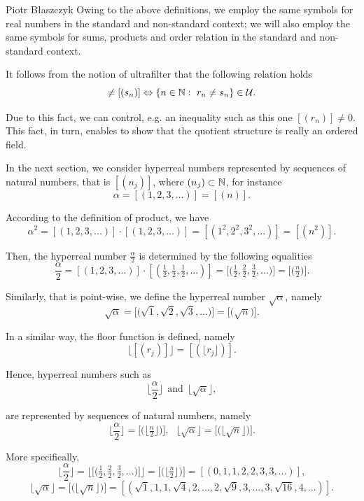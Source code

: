 \begin{artengenv}{Piotr Błaszczyk}
Owing to the above definitions,  we employ the same symbols for real numbers in the standard and non-standard context; we will also employ the same symbols for sums, products and order relation in the standard and non-standard context.

It follows from the notion of ultrafilter that the following relation holds
\begin{equation}[(r_n)]\neq [(s_n)]\Leftrightarrow \{n\in \N:\ r_n\neq s_n\}\in\mathcal U.\end{equation}

Due to this fact, we can control, e.g. an inequality such as this one $[(r_n)]\neq 0$. This fact, in turn, enables to show that the quotient structure is really an ordered field.



In the next section, we  consider hyperreal numbers represented by sequences of natural numbers, that is $[(n_j)]$, where $(n_j)\subset {\mathbb{N}}$, for instance
\begin{equation}\alpha=[(1,2,3,...)]=[(n)].\end{equation}

According to the definition of product, we have
\[\alpha^2=[(1,2,3,...)]\cdot[(1,2,3,...)]= [(1^2,2^2,3^2,...)]=[(n^2)].\]

Then, the hyperreal number $\frac \alpha 2$ is determined by the following equalities
\[\frac \alpha 2=[(1,2,3,...)]\cdot [(\tfrac 12,\tfrac 12,\tfrac 12,...)] =\big[\big(\tfrac 12,\tfrac 22,\tfrac 32,...\big)\big]=\big[\big(\tfrac n2\big)\big].\]

Similarly, that  is point-wise,  we define the hyperreal number $\sqrt{\alpha}$, namely
\[\sqrt\alpha =\big[\big(\sqrt 1,\sqrt 2,\sqrt 3,...\big)\big]=\big[\big(\sqrt n\big)\big].\]

In a similar way, the floor function  is defined, namely
\[\big\lfloor [(r_j)]  \big\rfloor=[(\lfloor r_j  \rfloor)].\]

Hence, hyperreal numbers  such as
\[\Big\lfloor \frac\alpha 2 \Big\rfloor\ \ \mbox{and}\ \ \big\lfloor \sqrt\alpha\big\rfloor,\]

are represented by sequences of natural numbers, namely
\[\Big\lfloor \frac\alpha 2 \Big\rfloor= \big[\big(\big\lfloor \tfrac n2\big\rfloor\big)\big],\ \ \ \big\lfloor \sqrt\alpha\big\rfloor=  \big[\big(\big\lfloor\sqrt n\big\rfloor\big)\big].   \]

More specifically,
  \[\Big\lfloor \frac\alpha 2 \Big\rfloor= \Big\lfloor\big[\big(\tfrac 12,\tfrac 22,\tfrac 32,...\big)\big]\Big\rfloor= \big[\big(\big\lfloor \tfrac n2\big\rfloor\big)\big]     =[(0,1,1,2,2,3,3,...)],        \]
\[  \big\lfloor \sqrt\alpha\big\rfloor=  \big[\big(\big\lfloor\sqrt n\big\rfloor\big)\big]=
[(\sqrt 1,1,1,\sqrt 4,2,..., 2,\sqrt 9,3,...,3,\sqrt{16},4,...)].   \]


\end{artengenv}
